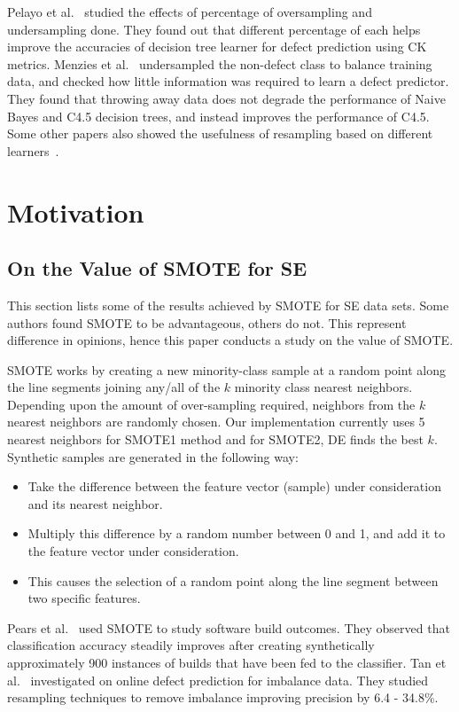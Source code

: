\documentclass[sigconf,review, anonymous]{acmart}
\newcommand{\bi}{\begin{itemize}[leftmargin=0.4cm]}
\newcommand{\ei}{\end{itemize}}
\theoremstyle{break}
\theoremstyle{break}
\begin{document}
Pelayo et al.~\cite{pelayo2007applying} studied the effects of percentage of oversampling and undersampling done. They found out that different percentage of each helps improve the accuracies of decision tree learner for defect prediction using CK metrics. Menzies et al.~\cite{menzies2008implications} undersampled the non-defect class to balance training
data, and checked how little information was required to learn a defect predictor. They found that throwing away data does not degrade the performance of Naive Bayes and C4.5 decision trees, and instead improves the performance of C4.5. Some other papers also showed the usefulness of resampling based on different learners~\cite{pelayo2007applying, pelayo2012evaluating, riquelme2008finding}.

\section{Motivation}

\subsection{On the Value of SMOTE for SE}
\label{sect:smote}

This section lists some of the results achieved by SMOTE for SE data sets. Some authors found SMOTE to be advantageous, others do not. This represent difference in opinions, hence this paper conducts a study on the value of SMOTE.

SMOTE works by creating a new minority-class sample at a random point along the line
segments joining any/all of the $k$ minority class nearest neighbors. Depending upon the
amount of over-sampling required, neighbors from the $k$ nearest neighbors are randomly
chosen. Our implementation currently uses 5 nearest neighbors for SMOTE1 method and for SMOTE2, DE finds the best $k$. Synthetic samples
are generated in the following way:
\bi
\item
Take the difference between the feature vector (sample)
under consideration and its nearest neighbor.
\item
Multiply this difference by a random number
between 0 and 1, and add it to the feature vector under consideration.
\item
This causes the
selection of a random point along the line segment between two specific features.
\ei
Pears et al.~\cite{pears2014synthetic} used SMOTE to study software build outcomes. They observed
that classification accuracy steadily improves after creating synthetically approximately 900 instances of builds that have been fed to the classifier. Tan et al.~\cite{tan2015online} investigated on online defect prediction for imbalance data. They studied resampling techniques to remove imbalance improving precision by 6.4 - 34.8\%.
\end{document}
